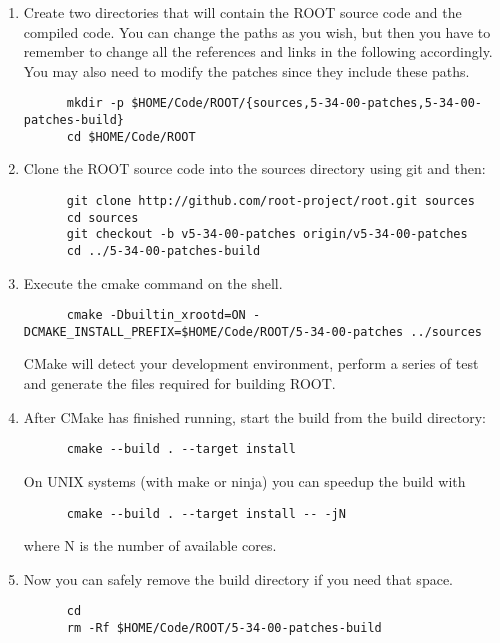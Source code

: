\begin{enumerate}[resume]
\item\label{root-2} Create two directories that will contain the ROOT source code
  and the compiled code. You can change the paths as you wish, but
  then you have to remember to change all the references and links in
  the following accordingly. You may also need to modify the patches
  since they include these paths.
\begin{lstlisting}
      mkdir -p $HOME/Code/ROOT/{sources,5-34-00-patches,5-34-00-patches-build}
      cd $HOME/Code/ROOT
\end{lstlisting}
\item\label{root-3} Clone the ROOT source code into the sources directory using git
  and then:
\begin{lstlisting}
      git clone http://github.com/root-project/root.git sources
      cd sources
      git checkout -b v5-34-00-patches origin/v5-34-00-patches
      cd ../5-34-00-patches-build
\end{lstlisting}
\item\label{root-4} Execute the cmake command on the shell.
\begin{lstlisting}
      cmake -Dbuiltin_xrootd=ON -DCMAKE_INSTALL_PREFIX=$HOME/Code/ROOT/5-34-00-patches ../sources
\end{lstlisting}
  CMake will detect your development environment, perform a series of
  test and generate the files required for building ROOT.\@
\item After CMake has finished running, start the build from the build
  directory:
\begin{lstlisting}
      cmake --build . --target install
\end{lstlisting}
  On UNIX systems (with make or ninja) you can speedup the build with%
\begin{lstlisting}
      cmake --build . --target install -- -jN
\end{lstlisting}
  where N is the number of available cores.
\item Now you can safely remove the build directory if you need that
  space.
\begin{lstlisting}
      cd
      rm -Rf $HOME/Code/ROOT/5-34-00-patches-build
\end{lstlisting}


\end{enumerate}
